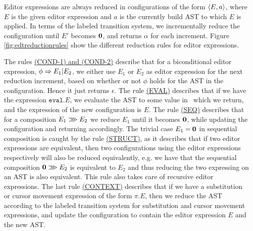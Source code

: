 Editor expressions are always reduced in configurations of the form
$\langle E,a \rangle$, where $E$ is the given editor expression and $a$ is the
currently build AST to which $E$ is applied. In terms of the labeled
transition system, we incrementally reduce the configuration until $E'$ becomes
$\mathbf{0}$, and returns $\alpha$ for each increment. Figure
\ref{fig:edtreductionrules} show the different reduction rules for editor
expressions.

The rules \hyperref[fig:edtreductionrules]{(COND-1) and (COND-2)} describe that
for a biconditional editor expression, $\phi \Rightarrow E_1|E_2$, we either use
$E_1$ or $E_2$ as editor expression for the next reduction increment, based on
whether or not $\phi$ holds for the AST in the configuration. Hence it just
returns $\epsilon$. The rule \hyperref[fig:edtreductionrules]{(EVAL)} describes
that if we have the expression $\texttt{eval}.E$, we evaluate the AST to some
value in \val~which we return, and the expression of the new configuration is
$E$. The rule \hyperref[fig:edtreductionrules]{(SEQ)} describes that for a
composition $E_1 \ggg E_2$ we reduce $E_1$ until it becomes $\mathbf{0}$, while
updating the configuration and returning accordingly. The trivial case $E_1 =
\mathbf{0}$ in sequential composition is caught by the rule
\hyperref[fig:edtreductionrules]{(STRUCT)}, as it describes that if two editor
expressions are equivalent, then two configurations using the editor expressions
respectively will also be reduced equivalently, e.g. we have that the sequential
composition $\mathbf{0} \ggg E_2$ is equivalent to $E_2$ and thus reducing the
two expressing on an AST is also equivalent. This rule also takes care of
recursive editor expressions. The last rule
\hyperref[fig:edtreductionrules]{(CONTEXT)} describes that if we have a
substitution or cursor movement expression of the form $\pi.E$, then we reduce
the AST according to the labeled transition system for substitution and cursor
movement expressions, and update the configuration to contain the editor
expression $E$ and the new AST. 

